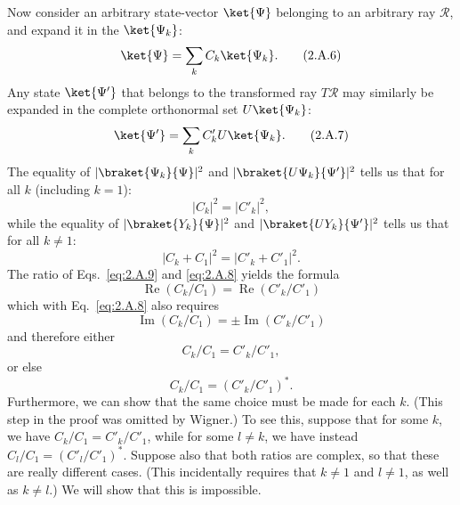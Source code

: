 Now consider an arbitrary state-vector $\ket{\Psi}$ belonging to an
arbitrary ray $\mathcal{R}$, and expand it in the $\ket{\Psi_k}$:
\begin{equation}
  \ket{\Psi}=\sum_k C_k\ket{\Psi_k}.
  \tag{2.A.6}\label{eq:2.A.6}
\end{equation}
Any state $\ket{\Psi'}$ that belongs to the transformed ray
$T\mathcal{R}$ may similarly be expanded in the complete orthonormal set
$U\ket{\Psi_k}$:
\begin{equation}
  \ket{\Psi'}=\sum_k C'_k U\ket{\Psi_k}.
  \tag{2.A.7}\label{eq:2.A.7}
\end{equation}
The equality of $|\braket{\Psi_k}{\Psi}|^2$ and
$|\braket{U\Psi_k}{\Psi'}|^2$ tells us that for all $k$
(including $k=1$):
\begin{equation}
  |C_k|^2=|C'_k|^2,
  \tag{2.A.8}\label{eq:2.A.8}
\end{equation}
while the equality of $|\braket{Y_k}{\Psi}|^2$ and
$|\braket{UY_k}{\Psi'}|^2$ tells us that for all $k\neq 1$:
\begin{equation}
  |C_k+C_1|^2=|C'_k+C'_1|^2.
  \tag{2.A.9}\label{eq:2.A.9}
\end{equation}
The ratio of Eqs.~\eqref{eq:2.A.9} and \eqref{eq:2.A.8} yields the formula
\begin{equation}
  \operatorname{Re}(C_k/C_1)=\operatorname{Re}(C'_k/C'_1)
  \tag{2.A.10}\label{eq:2.A.10}
\end{equation}
which with Eq.~\eqref{eq:2.A.8} also requires
\begin{equation}
  \operatorname{Im}(C_k/C_1)
    =\pm\operatorname{Im}(C'_k/C'_1)
  \tag{2.A.11}\label{eq:2.A.11}
\end{equation}
and therefore either
\begin{equation}
  C_k/C_1=C'_k/C'_1,
  \tag{2.A.12}\label{eq:2.A.12}
\end{equation}
or else
\begin{equation}
  C_k/C_1=(C'_k/C'_1)^{*}.
  \tag{2.A.13}\label{eq:2.A.13}
\end{equation}
Furthermore, we can show that the same choice must be made for each $k$.
(This step in the proof was omitted by Wigner.) To see this, suppose that
for some $k$, we have $C_k/C_1=C'_k/C'_1$, while for some $l\neq k$, we
have instead $C_l/C_1=(C'_l/C'_1)^*$. Suppose also that both ratios are
complex, so that these are really different cases. (This incidentally
requires that $k\neq 1$ and $l\neq 1$, as well as $k\neq l$.) We will show
that this is impossible.

